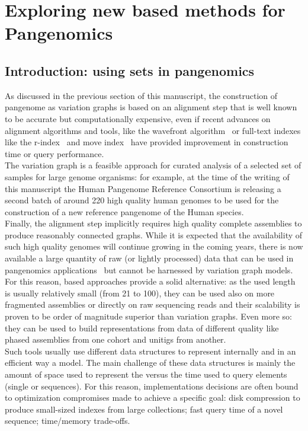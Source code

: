 \chapter{Exploring new \kmer based methods for Pangenomics} %
\label{sec:complexity}

\section{Introduction: using \kmer sets in pangenomics}%
As discussed in the previous section of this manuscript, the  construction of pangenome as variation graphs is based on an alignment step that is well known to be accurate but computationally expensive, even if recent advances on alignment algorithms and tools, like the wavefront algorithm~\cite{wavefront} or full-text indexes like the r-index~\cite{spumoni2} and move index~\cite{movi} have provided improvement in construction time or query performance.\\
The variation graph is a feasible approach for curated analysis of a selected set of samples for large genome organisms: for example, at the time of the writing of this manuscript the Human Pangenome Reference Consortium is releasing a second batch of around 220 high quality human genomes to be used for the construction of a new reference pangenome of the Human species.\\
Finally, the alignment step implicitly requires high quality complete assemblies to produce reasonably connected graphs. While it is expected that the availability of such high quality genomes will continue growing in the coming years, there is now available a large quantity of raw (or lightly processed) data that can be used in pangenomics applications~\cite{serratus,logan} but cannot be harnessed by variation graph models.\\ 
For this reason, \kmer based approaches provide a solid alternative: as the used \kmer length is usually relatively small (from 21 to 100), they can be used also on more fragmented assemblies or directly on raw sequencing reads and their scalability is proven to be order of magnitude superior than variation graphs. Even more so: they can be used to build representations from data of different quality like phased assemblies from one cohort and unitigs from another.\\
Such tools usually use different data structures to represent internally and in an efficient way a \dbg model. The main challenge of these data structures is mainly the amount of space used to represent the \kmers versus the time used to query elements (single \kmers or sequences). For this reason, implementations decisions are often bound to optimization compromises made to achieve a specific goal: disk compression to produce small-sized indexes from large collections; fast query time of a novel sequence; time/memory trade-offs.
